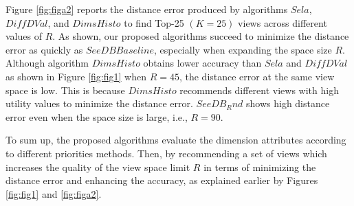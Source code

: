 Figure \ref{fig:figa2} reports the distance error produced by algorithms $Sela$, $Diff DVal$, and $DimsHisto$ to find Top-25 $(K=25)$ views across different values of $R$. 
%
As shown, our proposed algorithms succeed to minimize the distance error as quickly as $SeeDB Baseline$, especially when expanding the space size $R$. 
%
Although algorithm $DimsHisto$ obtains lower accuracy than $Sela$ and $Diff DVal$ as shown in Figure \ref{fig:fig1} when $R = 45$, the distance error at the same view space is low. 
%
This is because $DimsHisto$ recommends different views with high utility values to minimize the distance error.
$SeeDB_Rnd$ shows high distance error even when the space size is large, i.e., $R = 90$.

To sum up, the proposed algorithms evaluate the dimension attributes according to different priorities methods. 
%
Then, by recommending a set of views which increases the quality of the view space limit $R$ in terms of minimizing the distance error and enhancing the accuracy, as explained earlier by Figures \ref{fig:fig1} and  \ref{fig:figa2}.
  

